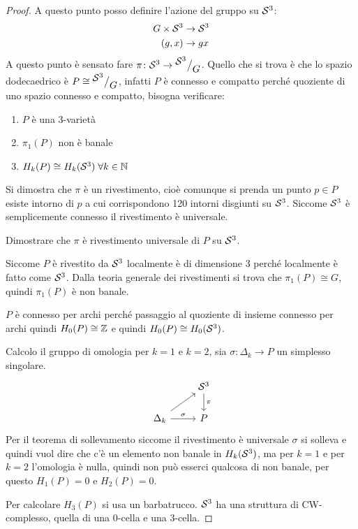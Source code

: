 \begin{proof}
  A questo punto posso definire l'azione del gruppo su $ \mathcal{S}^{3} $:
  \begin{align*}
    G \times \mathcal{S}^{3} & \to \mathcal{S}^{3} \\
    (g,x) & \to gx
  \end{align*}
  A questo punto è sensato fare $ \pi \colon \mathcal{S}^{3} \to {^{\textstyle \mathcal{S}^{3}}\big/_{\textstyle G}} $.
  Quello che si trova è che lo spazio dodecaedrico è $ P \cong {^{\textstyle \mathcal{S}^{3}}\big/_{\textstyle G}} $, infatti
  $ P $ è connesso e compatto perché quoziente di uno spazio connesso e compatto, bisogna
  verificare:
  \begin{enumerate}
  \item $ P $ è una $ 3 $-varietà
  \item $ \pi_1(P) $ non è banale
  \item $ H_k(P) \cong H_k(\mathcal{S}^{3}) \; \forall k \in \mathbb{N}$
  \end{enumerate}
  Si dimostra che $ \pi $ è un rivestimento, cioè comunque si prenda un punto $ p \in P $
  esiste intorno di $ p $ a cui corrispondono 120 intorni disgiunti su $ \mathcal{S}^{3} $.
  Siccome $ \mathcal{S}^{3} $ è semplicemente connesso il rivestimento è universale.
  \begin{exercise}
    Dimostrare che $ \pi $ è rivestimento universale di $ P $ su $ \mathcal{S}^{3} $.
  \end{exercise}
  Siccome $ P $ è rivestito da $ \mathcal{S}^{3} $ localmente è di dimensione 3 perché localmente
  è fatto come $ \mathcal{S}^{3} $.
  Dalla teoria generale dei rivestimenti si trova che $ \pi_1(P) \cong G $, quindi $ \pi_1(P) $ è non banale.

  $ P $ è connesso per archi perché passaggio al quoziente di insieme connesso per archi
  quindi $ H_0(P) \cong \mathbb{Z} $ e quindi $ H_0(P) \cong H_0(\mathcal{S}^{3}) $.

  Calcolo il gruppo di omologia per $ k = 1 $ e $ k = 2 $, sia $ \sigma \colon \Delta_k \to P $ un
  simplesso singolare.
  \[
    \begin{tikzcd}
      {} & \Sph{3} \dar{\pi} \\
      \Delta_k \rar{\sigma} \arrow{ru}{} & P
    \end{tikzcd}
  \]
  Per il teorema di sollevamento siccome il rivestimento è universale
  $ \sigma $ si solleva e quindi vuol dire che c'è un elemento non banale in $ H_k(\mathcal{S}^{3}) $,
  ma per $ k = 1 $ e per $ k = 2 $ l'omologia è nulla, quindi non può esserci
  qualcosa di non banale, per questo $ H_1(P) = 0 $ e $ H_2(P) = 0 $.

  Per calcolare $ H_3(P) $ si usa un barbatrucco.
  $ \mathcal{S}^{3} $ ha una struttura di CW-complesso, quella di una $ 0 $-cella e una $ 3 $-cella.


\end{proof}
